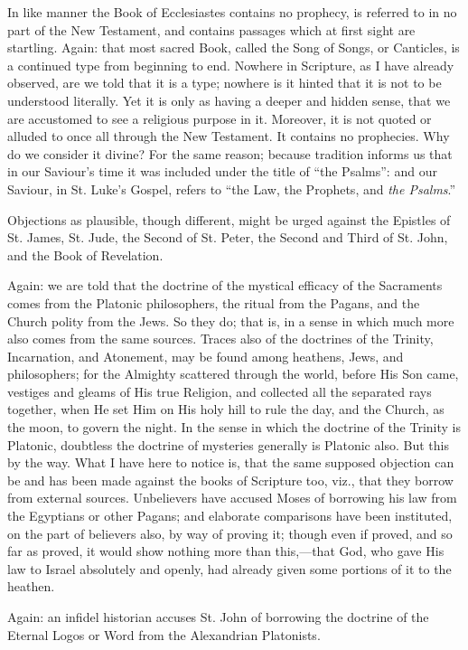 In like manner the Book of Ecclesiastes contains no prophecy, is
referred to in no part of the New Testament, and contains passages
which at first sight are startling. Again: that most sacred Book,
called the Song of Songs, or Canticles, is a continued type from
beginning to end. Nowhere in Scripture, as I have already observed,
are we told that it is a type; nowhere is it hinted that it is not to
be understood literally. Yet it is only as having a deeper and hidden
sense, that we are accustomed to see a religious purpose in it.
Moreover, it is not quoted or alluded to once all through the New
Testament. It contains no prophecies. Why do we consider it divine?
For the same reason; because tradition informs us that in our Saviour's
time it was included under the title of ``the Psalms'': and
our Saviour, in St. Luke's Gospel, refers to ``the Law, the
Prophets, and \emph{the Psalms}.''

Objections as plausible, though different, might be urged against
the Epistles of St. James, St. Jude, the Second of St. Peter, the
Second and Third of St. John, and the Book of Revelation.

Again: we are told that the doctrine of the mystical efficacy of
the Sacraments comes from the Platonic philosophers, the ritual from
the Pagans, and the Church polity from the Jews. So they do; that is,
in a sense in which much more also comes from the same sources. Traces
also of the doctrines of the Trinity, Incarnation, and Atonement, may
be found among heathens, Jews, and philosophers; for the Almighty
scattered through the world, before His Son came, vestiges and gleams
of His true Religion, and collected all the separated rays
together, when He set Him on His holy hill to rule the day, and the
Church, as the moon, to govern the night. In the sense in which the
doctrine of the Trinity is Platonic, doubtless the doctrine of
mysteries generally is Platonic also. But this by the way. What I have
here to notice is, that the same supposed objection can be and has
been made against the books of Scripture too, viz., that they borrow
from external sources. Unbelievers have accused Moses of borrowing his
law from the Egyptians or other Pagans; and elaborate comparisons have
been instituted, on the part of believers also, by way of proving it;
though even if proved, and so far as proved, it would show nothing
more than this,—that God, who gave His law to Israel absolutely and
openly, had already given some portions of it to the heathen.

Again: an infidel historian accuses St. John of borrowing the
doctrine of the Eternal Logos or Word from the Alexandrian Platonists.

